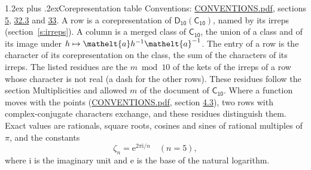 \documentclass[10pt,a4paper]{article}
\makeatletter
\renewcommand\section{\@startsection{section}{1}{\z@}{-3ex plus -1ex minus -.2ex}%
  {1.2ex plus .2ex}{\normalfont\large\sffamily\bfseries\color{parttitle}}}
\numberwithin{equation}{section}
\newcommand{\eltfont}[1]{{\let\sigma\eltsigma\mathelt{#1}}}
\newcommand{\grp}[1]{\mathsf{#1}}
\newcommand{\elt}[1]{\eltfont{#1}}
\newcommand{\iunit}{\mathrm{i}}
\newcommand{\expe}{\mathrm{e}}
\newcommand{\rootunity}[1]{\zeta_{#1}}
\makeatother
\begin{document}
\section{Corepresentation table}\label{s:character_table}
Conventions: \href{../../CONVENTIONS.pdf}{CONVENTIONS.pdf}, sections \href{../../../rotation/CONVENTIONS.pdf\#conv.5}{5}, \href{../../CONVENTIONS.pdf\#conv.32.3}{32.3} and \href{../../CONVENTIONS.pdf\#conv.33}{33}.
A row is a corepresentation of $\grp{D_{10}}(\grp{C_{10}})$, named by its irreps (section~\ref{s:irreps}). A column is a merged class of $\grp{C_{10}}$, the union of a class and of its image under $h \mapsto \elt{a} h^{-1} \elt{a}^{-1}$. The entry of a row is the character of its corepresentation on the class, the sum of the characters of its irreps.
\leavevmode\label{n:head.parity}The listed residues are the $m \bmod 10$ of the kets of the irreps of a row whose character is not real (a dash for the other rows). These residues follow the section Multiplicities and allowed $m$ of the document of \href{../../../rotation/data/pdf/C10.pdf}{$\grp{C_{10}}$}. Where a function moves with the points (\href{../../CONVENTIONS.pdf}{CONVENTIONS.pdf}, section \href{../../../rotation/CONVENTIONS.pdf\#conv.4.3}{4.3}), two rows with complex-conjugate characters exchange, and these residues distinguish them.
\leavevmode\label{n:constant.root}\label{n:index.root.order}Exact values are rationals, square roots, cosines and sines of rational multiples of $\pi$, and the constants
\begin{equation}\label{e:constants}\rootunity{n} = \expe^{2\pi\iunit/n}\quad(n = 5),\end{equation}
where $\iunit$ is the imaginary unit and $\expe$ is the base of the natural logarithm.
\end{document}
